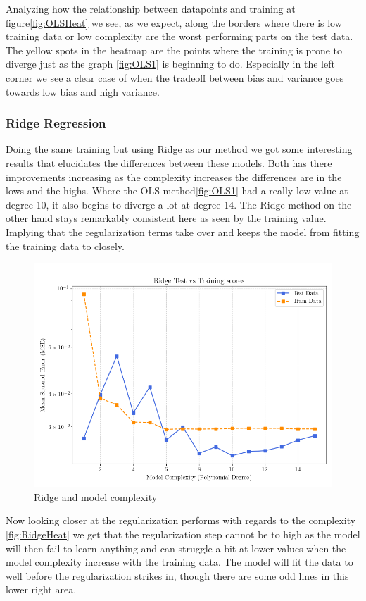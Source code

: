 \documentclass[twocolumn,aps]{revtex4}
\begin{document}
Analyzing how the relationship between datapoints and training at figure\ref{fig:OLSHeat} we see, as we expect, along the borders where there is low training data or low complexity are the worst performing parts on the test data. 
The yellow spots in the heatmap are the points where the training is prone to diverge just as the graph \ref{fig:OLS1} is beginning to do.
Especially in the left corner we see a clear case of when the tradeoff between bias and variance goes towards low bias and high variance.


\subsubsection{Ridge Regression}
Doing the same training but using Ridge as our method we got some interesting results that elucidates the differences between these models.
Both has there improvements increasing as the complexity increases the differences are in the lows and the highs.
Where the OLS method\ref{fig:OLS1} had a really low value at degree 10, it also begins to diverge a lot at degree 14.
The Ridge method on the other hand stays remarkably consistent here as seen by the training value. 
Implying that the regularization terms take over and keeps the model from fitting the training data to closely. 

\begin{figure}[h]
    \centering
    \includegraphics[width=.95 \linewidth]{Figures/MSE_RidgeOnly.png}
    \caption{Ridge and model complexity}
    \label{fig:RidgeMse}
\end{figure}

Now looking closer at the regularization performs with regards to the complexity \ref{fig:RidgeHeat} we get that the regularization step cannot be to high as the model will then fail to learn anything and can struggle a bit at lower values when the model complexity increase with the training data.
The model will fit the data to well before the regularization strikes in, though there are some odd lines in this lower right area.
\end{document}
